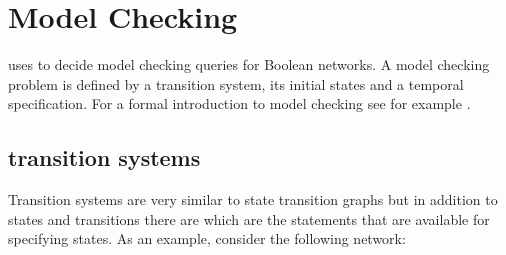\documentclass[letterpaper,10pt,english]{sphinxmanual}
\begin{document}
\section{Model Checking}
\label{\detokenize{Manual:sec-model-checking}}\label{\detokenize{Manual:model-checking}}
 uses {\hyperref[\detokenize{Installation:installation-nusmv}]{}} to decide model checking queries for Boolean networks.
A model checking problem is defined by a transition system, its initial states and a temporal specification.
For a formal introduction to model checking see for example {\hyperref[\detokenize{Bibliography:baier2008}]{}}.


\subsection{transition systems}
\label{\detokenize{Manual:transition-systems}}
Transition systems are very similar to state transition graphs but in addition to states and transitions there are 
which are the statements that are available for specifying states.
As an example, consider the following network:

\begin{sphinxVerbatim}[commandchars=\\\{\}]
  \PYG{p}{[}
        
        \PYG{p}{]}
  
  
   
\PYG{p}{[}\PYG{p}{]}  
 
\end{sphinxVerbatim}
\end{document}
